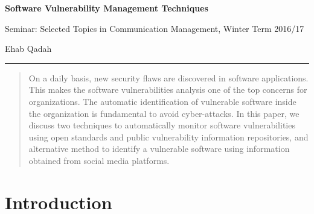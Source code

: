 \documentclass{llncs}
\begin{document}
\begin{flushleft}
 
 \thispagestyle{empty}
\centering\LARGE {\bf Software Vulnerability Management Techniques}




\vspace{2pt}


\centering
 Seminar: Selected Topics in Communication Management,
 Winter Term 2016/17



\centering
 Ehab Qadah\\
\rule{\textwidth}{1pt}



 

\end{flushleft}




\begin{abstract}
On a daily basis, new security flaws are discovered in software applications. This makes the software vulnerabilities analysis one of the top concerns for organizations. The automatic identification of vulnerable software inside the organization is fundamental to avoid cyber-attacks. In this paper, we discuss two techniques to automatically monitor software vulnerabilities using open standards and public vulnerability information repositories, and alternative method to identify a vulnerable software using information obtained from social media platforms. 
\end{abstract}

\section{Introduction}
\end{document}
